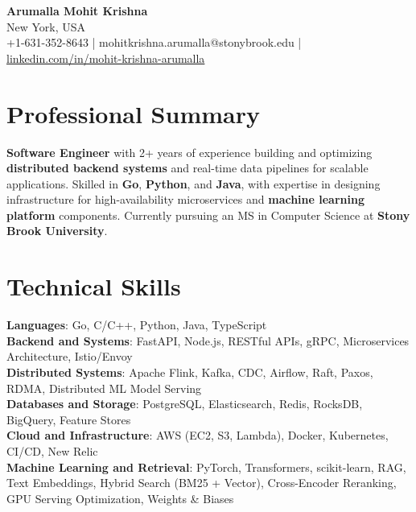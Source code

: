 \documentclass[letterpaper,11pt]{article}
\begin{document}
\begin{center}
  {\Large \textbf{Arumalla Mohit Krishna}} \\
  New York, USA \\
  +1-631-352-8643 \enspace | \enspace mohitkrishna.arumalla@stonybrook.edu \enspace | \enspace \href{https://www.linkedin.com/in/mohit-krishna-arumalla}{linkedin.com/in/mohit-krishna-arumalla}
\end{center}

\section{Professional Summary}
  \begin{itemize}[leftmargin=0.15in, label={}]
    \small{\item{
     \textbf{Software Engineer} with 2+ years of experience building and optimizing \textbf{distributed backend systems} and real-time data pipelines for scalable applications. Skilled in \textbf{Go}, \textbf{Python}, and \textbf{Java}, with expertise in designing infrastructure for high-availability microservices and \textbf{machine learning platform} components. Currently pursuing an MS in Computer Science at \textbf{Stony Brook University}.
    }}
  \end{itemize}
\vspace{-16pt}

\section{Technical Skills}
 \begin{itemize}[leftmargin=0.15in, label={}]
    \small{\item{
     \textbf{Languages}: Go, C/C++, Python, Java, TypeScript \\
     \textbf{Backend and Systems}: FastAPI, Node.js, RESTful APIs, gRPC, Microservices Architecture, Istio/Envoy \\
     \textbf{Distributed Systems}: Apache Flink, Kafka, CDC, Airflow, Raft, Paxos, RDMA, Distributed ML Model Serving \\
     \textbf{Databases and Storage}: PostgreSQL, Elasticsearch, Redis, RocksDB, BigQuery, Feature Stores \\
     \textbf{Cloud and Infrastructure}: AWS (EC2, S3, Lambda), Docker, Kubernetes, CI/CD, New Relic \\
     \textbf{Machine Learning and Retrieval}: PyTorch, Transformers, scikit-learn, RAG, Text Embeddings, Hybrid Search (BM25 + Vector), Cross-Encoder Reranking, GPU Serving Optimization, Weights \& Biases
    }}
 \end{itemize}
\vspace{-16pt}
\end{document}
